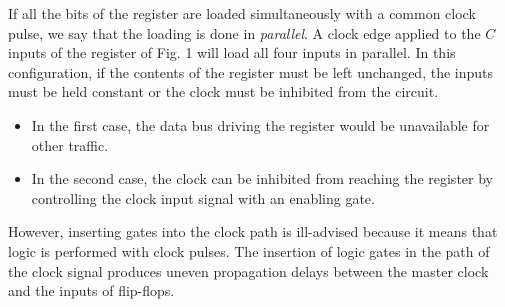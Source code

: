 If all the bits of the register are loaded simultaneously with a common clock pulse, we say that the loading is done in \textit{parallel}. A clock edge applied to the $C$ inputs of the register of Fig. 1 will load all four inputs in parallel. In this configuration, if the contents of the register must be left unchanged, the inputs must be held constant or the clock must be inhibited from the circuit.
\begin{itemize}[leftmargin=0.7cm]
  \item In the first case, the data bus driving the register would be unavailable for other traffic.
  \item In the second case, the clock can be inhibited from reaching the register by controlling the clock input signal with an enabling gate.
\end{itemize}
\noindent However, inserting gates into the clock path is ill-advised because it means that logic is performed with clock pulses. The insertion of logic gates in the path of the clock signal produces uneven propagation delays between the master clock and the inputs of flip-flops.

